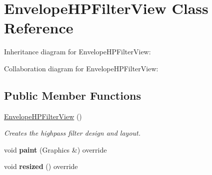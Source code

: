 \hypertarget{class_envelope_h_p_filter_view}{}\section{Envelope\+H\+P\+Filter\+View Class Reference}
\label{class_envelope_h_p_filter_view}


Inheritance diagram for Envelope\+H\+P\+Filter\+View\+:


Collaboration diagram for Envelope\+H\+P\+Filter\+View\+:
\subsection*{Public Member Functions}
\begin{DoxyCompactItemize}
\item 
\hyperlink{class_envelope_h_p_filter_view_af8d2027516856aa033f6f0a3ee4888b3}{Envelope\+H\+P\+Filter\+View} ()\hypertarget{class_envelope_h_p_filter_view_af8d2027516856aa033f6f0a3ee4888b3}{}\label{class_envelope_h_p_filter_view_af8d2027516856aa033f6f0a3ee4888b3}

\begin{DoxyCompactList}\small\item\em Creates the highpass filter design and layout. \end{DoxyCompactList}\item 
void {\bfseries paint} (Graphics \&) override\hypertarget{class_envelope_h_p_filter_view_af629a9899d05e17466ff3cda6eae90ca}{}\label{class_envelope_h_p_filter_view_af629a9899d05e17466ff3cda6eae90ca}

\item 
void {\bfseries resized} () override\hypertarget{class_envelope_h_p_filter_view_a37cf1322c5bccecd6eb5496b7bd82ff4}{}\label{class_envelope_h_p_filter_view_a37cf1322c5bccecd6eb5496b7bd82ff4}

\end{DoxyCompactItemize}
